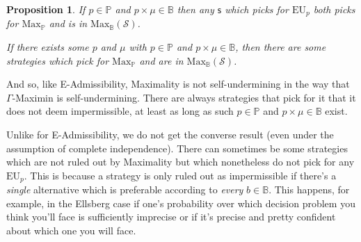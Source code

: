 \documentclass[a4paper]{article}
\newtheorem{proposition}[theorem]{Proposition}
\renewcommand\P{\mathbb{P}} %
\newcommand\EU{\mathrm{EU}}
\newcommand\EAd{\mathrm{EAd}}
\newcommand\Maximality{\mathrm{Max}}
\renewcommand\S{\mathcal{S}}
\newcommand\s{\mathsf{s}}
\newcommand{\IB}{\mathbb{B}}
\newcommand{\IP}{\P}
\renewcommand{\color}[1]{}
\newenvironment{colored}[1]{\leavevmode\color{#1}}{}
\newcommand{\Strategies}{\S}
\newenvironment{CCM rewritten}
{\begingroup\color{blue}} %
{\endgroup}              %
\begin{document}
\begin{colored}{violet}
	 \begin{proposition}\label{thm:max-suff}
	If $p\in\IP$ and $p\times\mu\in\IB$ then any $\s$ which picks for $\EU_p$ both picks for $\Maximality_\IP$ and is in $\Maximality_\IB(\S)$. 
	
	If there exists some $p$ and $\mu$ with $p\in\IP$ and $p\times\mu\in\IB$, then there are some strategies which pick for $\Maximality_\IP$ and are in $\Maximality_\IB(\S)$. 
\end{proposition}

\end{colored}
\begin{comment}
Since Maximality is a more permissive decision theory than E-Admissibility, \cref{thm:ead-equiv[indep]} entails:



\begin{proposition}\label{thm:max-suff}
	If $\s$ picks for $\EU_p$, for some $p$ in $\IP$ with some $p\times \mu\in \IB$, then $\s$ picks for $\Maximality_\IP$ and $\s$ is in $\Maximality_\IB(\Strategies)$.
%	
\end{proposition}
\end{comment}

And so, like E-Admissibility, Maximality is not self-undermining in the way that $\Gamma$-Maximin is self-undermining. There are always strategies that pick for it that it does not deem impermissible, \begin{colored}{violet}
	at least as long as such $p\in\IP$ and $p\times\mu\in\IB$ exist.
\end{colored}

Unlike for E-Admissibility, we do not get the converse result (even under the assumption of complete independence). There can sometimes be some strategies which are not ruled out by Maximality but which nonetheless do not pick for any $\EU_p$. This is because a strategy is only ruled out as impermissible if there's a \emph{single} alternative which is preferable according to \emph{every} $b\in \IB$. 
This happens, for example, in the Ellsberg case if one's probability over which decision problem you think you'll face is sufficiently imprecise or if it's precise and pretty confident about which one you will face. 
\end{document}
